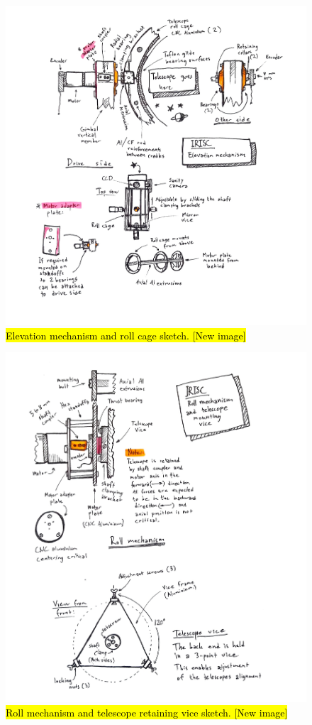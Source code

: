 \begin{figure}[h!] 
		\includegraphics[width=\textwidth]{appendix/img/mechanical_sketches/elevation_mechanism.jpg}
		\caption{\hl{Elevation mechanism and roll cage  sketch. [New image]}}		
			\label{img:el_sketch}
\end{figure}
\newpage
\begin{figure}[h!] 
		\includegraphics[width=\textwidth]{appendix/img/mechanical_sketches/roll_mechanism.jpg}
		\caption{\hl{Roll mechanism and telescope retaining vice sketch. [New image]}}
		\label{img:roll_sketch}
\end{figure}
\newpage
% 


